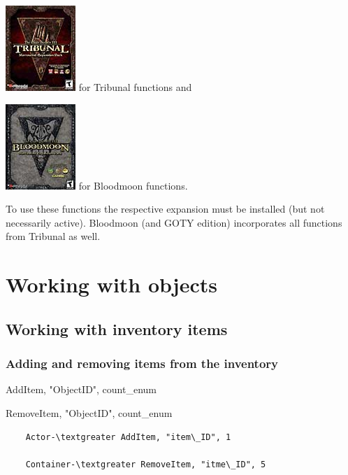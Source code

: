 \includegraphics{media/image6.png} for Tribunal functions and

\includegraphics{media/image7.png} for Bloodmoon functions.

To use these functions the respective expansion must be installed (but
not necessarily active). Bloodmoon (and GOTY edition) incorporates all
functions from Tribunal as well.

\hypertarget{working-with-objects}{%
\section{\texorpdfstring{\hfill\break
Working with
objects}{ Working with objects}}\label{working-with-objects}}

\hypertarget{working-with-inventory-items}{%
\subsection{Working with inventory
items}\label{working-with-inventory-items}}

\hypertarget{adding-and-removing-items-from-the-inventory}{%
\subsubsection{Adding and removing items from the
inventory}\label{adding-and-removing-items-from-the-inventory}}

	AddItem, "ObjectID", count\_enum
	
	RemoveItem, "ObjectID", count\_enum

\begin{lstlisting}	
	Actor-\textgreater AddItem, "item\_ID", 1
	
	Container-\textgreater RemoveItem, "itme\_ID", 5
\end{lstlisting}

